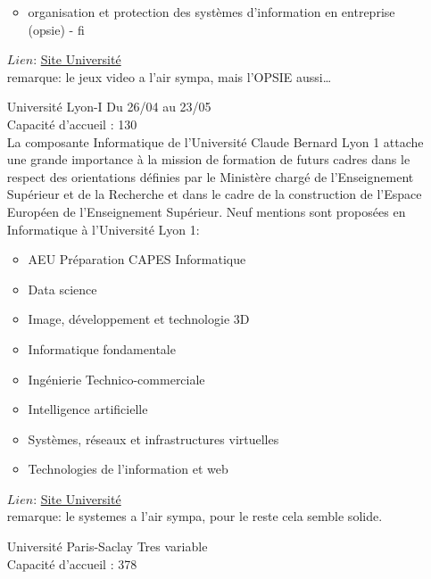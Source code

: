 \documentclass[a4paper,11pt]{article}
\begin{document}
\begin{enumerate}
\begin{itemize}
                        \item organisation et protection des systèmes d'information en entreprise (opsie) - fi 
                    \end{itemize}
                    $Lien$: \href{https://www.univ-lyon2.fr/master-1-informatique-1}{Site Université}
                    \\ remarque: le jeux video a l'air sympa, mais l'OPSIE aussi\ldots
\\
        \item [\color{LightOrangeHaf}Université Lyon-I] Du 26/04 au 23/05
                    \\Capacité d'accueil : 130
                    \\La composante Informatique de l’Université Claude Bernard Lyon 1 attache une grande importance à la mission de formation de futurs cadres dans le respect des orientations définies par le Ministère chargé de l’Enseignement Supérieur et de la Recherche et dans le cadre de la construction de l’Espace Européen de l’Enseignement Supérieur. Neuf mentions sont proposées en Informatique à l'Université Lyon 1:
                    \begin{itemize}
                        \item AEU Préparation CAPES Informatique
                        \item Data science
                        \item Image, développement et technologie 3D
                        \item Informatique fondamentale
                        \item Ingénierie Technico-commerciale
                        \item Intelligence artificielle
                        \item Systèmes, réseaux et infrastructures virtuelles
                        \item Technologies de l'information et web
                    \end{itemize}
                    $Lien$: \href{http://offre-de-formations.univ-lyon1.fr/mention-52/informatique.html}{Site Université}
                    \\ remarque: le systemes a l'air sympa, pour le reste cela semble solide.
\\
        \item [\color{LightOrangeHaf}Université Paris-Saclay] Tres variable
                    \\Capacité d'accueil : 378

\end{enumerate}
\end{document}
